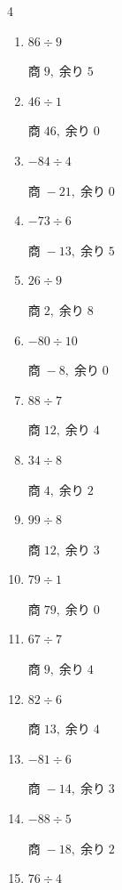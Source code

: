 \begin{multicols}{4}
\begin{enumerate}
  \item $86 \div 9$

        $商\; 9,\; 余り\; 5$

  \item $46 \div 1$

        $商\; 46,\; 余り\; 0$

  \item $-84 \div 4$

        $商\; -21,\; 余り\; 0$

  \item $-73 \div 6$

        $商\; -13,\; 余り\; 5$

  \item $26 \div 9$

        $商\; 2,\; 余り\; 8$

  \item $-80 \div 10$

        $商\; -8,\; 余り\; 0$

  \item $88 \div 7$

        $商\; 12,\; 余り\; 4$

\columnbreak %

\resetques

  \item $34 \div 8$

        $商\; 4,\; 余り\; 2$

  \item $99 \div 8$

        $商\; 12,\; 余り\; 3$

  \item $79 \div 1$

        $商\; 79,\; 余り\; 0$

  \item $67 \div 7$

        $商\; 9,\; 余り\; 4$

  \item $82 \div 6$

        $商\; 13,\; 余り\; 4$

  \item $-81 \div 6$

        $商\; -14,\; 余り\; 3$

  \item $-88 \div 5$

        $商\; -18,\; 余り\; 2$

  \item $76 \div 4$


\end{enumerate}
\end{multicols}

